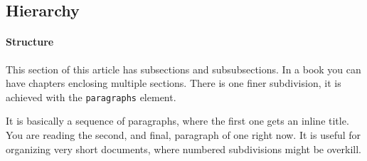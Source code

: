 \documentclass[10pt,]{article}
\theoremstyle{plain}
\theoremstyle{definition}
\theoremstyle{definition}
\theoremstyle{definition}
\theoremstyle{definition}
\theoremstyle{definition}
\theoremstyle{definition}
\numberwithin{equation}{section}
\begin{document}
\subsection[{Hierarchy}]{Hierarchy}\label{subsection-5}
\typeout{************************************************}
\typeout{************************************************}
\paragraph[{Structure}]{Structure}\hypertarget{hierarchy-structure}{}
\hypertarget{p-123}{}%
This section of this article has subsections and subsubsections.  In a book you can have chapters enclosing multiple sections.  There is one finer subdivision, it is achieved with the \lstinline?paragraphs? element.%
\par
\hypertarget{p-124}{}%
It is basically a sequence of paragraphs, where the first one gets an inline title.  You are reading the second, and final, paragraph of one right now. It is useful for organizing very short documents, where numbered subdivisions might be overkill.%
\typeout{************************************************}
\typeout{************************************************}
\end{document}
